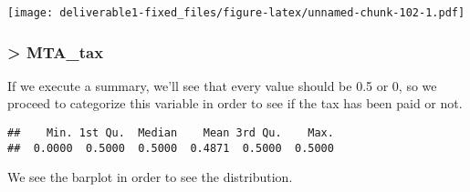 \documentclass[
  18pt,
  a4paper]{article}
\newenvironment{Shaded}{\begin{snugshade}}{\end{snugshade}}
\newcommand{\DataTypeTok}[1]{\textcolor[rgb]{0.13,0.29,0.53}{#1}}
\newcommand{\KeywordTok}[1]{\textcolor[rgb]{0.13,0.29,0.53}{\textbf{#1}}}
\newcommand{\NormalTok}[1]{#1}
\newcommand{\OperatorTok}[1]{\textcolor[rgb]{0.81,0.36,0.00}{\textbf{#1}}}
\newcommand{\StringTok}[1]{\textcolor[rgb]{0.31,0.60,0.02}{#1}}
\begin{document}
\begin{Shaded}
\end{Shaded}

\texttt{[image: deliverable1-fixed\_files/figure-latex/unnamed-chunk-102-1.pdf]}

\hypertarget{mta_tax-1}{%
\subsubsection{\textgreater{} MTA\_tax}\label{mta_tax-1}}

If we execute a summary, we'll see that every value should be 0.5 or 0,
so we proceed to categorize this variable in order to see if the tax has
been paid or not.

\begin{Shaded}
\end{Shaded}

\begin{verbatim}
##    Min. 1st Qu.  Median    Mean 3rd Qu.    Max. 
##  0.0000  0.5000  0.5000  0.4871  0.5000  0.5000
\end{verbatim}

\begin{Shaded}
\end{Shaded}

We see the barplot in order to see the distribution.

\begin{Shaded}
\end{Shaded}
\end{document}
